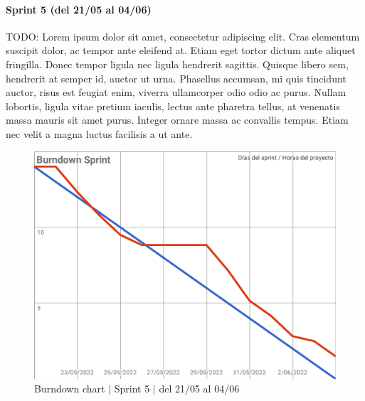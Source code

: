 \paragraph{Sprint 5 (del 21/05 al 04/06)}
TODO: Lorem ipsum dolor sit amet, consectetur adipiscing elit. Cras elementum suscipit dolor, ac tempor ante eleifend at. Etiam eget tortor dictum ante aliquet fringilla. Donec tempor ligula nec ligula hendrerit sagittis. Quisque libero sem, hendrerit at semper id, auctor ut urna. Phasellus accumsan, mi quis tincidunt auctor, risus est feugiat enim, viverra ullamcorper odio odio ac purus. Nullam lobortis, ligula vitae pretium iaculis, lectus ante pharetra tellus, at venenatis massa mauris sit amet purus. Integer ornare massa ac convallis tempus. Etiam nec velit a magna luctus facilisis a ut ante.
\begin{figure}[H]
    \centering
    \includegraphics[width=1\linewidth]{text/image/BurndownChart5.pdf}
    \caption{Burndown chart $|$ Sprint 5 $|$ del 21/05 al 04/06}
    \label{fig:burndown_chart_5}
\end{figure}

\newpage
